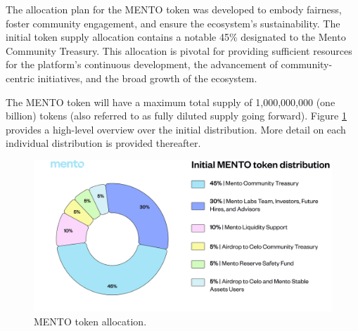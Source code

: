 \documentclass[a4paper]{article}
\theoremstyle{definition}
\begin{document}
The allocation plan for the MENTO token was developed to embody fairness, foster community engagement, and ensure the ecosystem's sustainability. The initial token supply allocation contains a notable 45\% designated to the Mento Community Treasury. This allocation is pivotal for providing sufficient resources for the platform's continuous development, the advancement of community-centric initiatives, and the broad growth of the ecosystem.

The MENTO token will have a maximum total supply of 1,000,000,000 (one billion) tokens (also referred to as fully diluted supply going forward). Figure \ref{fig:mento_distribution} provides a high-level overview over the initial distribution. More detail on each individual distribution is provided thereafter.

\begin{figure}[ht]
    \centering
    \includegraphics[width=1\linewidth]{figures/mento_distributions.png}
    \caption{MENTO token allocation.}
    \label{fig:mento_distribution}
\end{figure}
\end{document}
